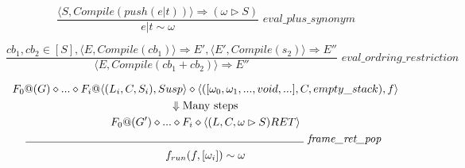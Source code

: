 \documentclass[]{article}
\numberwithin{equation}{section}
\numberwithin{figure}{section}
\numberwithin{table}{section}
\begin{document}
\[\frac{\langle S, Compile(push(e|t)) \rangle \Rightarrow (\omega \rhd S)}
        {e|t \sim \omega} \textit{ eval\_plus\_synonym} \]

\[\frac{cb_1, cb_2 \in [S], \langle E, Compile(cb_1) \rangle \Rightarrow E', \langle E', Compile(s_2) \rangle \Rightarrow E''}
       {\langle E, Compile(cb_1 + cb_2) \rangle \Rightarrow E''} \textit{ eval\_ordring\_restriction } \]

\begin{gather*} F_0@(G) \diamond ... \diamond F_i @\langle(L_i, C, S_i) , Susp \rangle \diamond \langle ([\omega_0, \omega_1, ..., void, ...], C, empty\_stack) , f \rangle \\ \Downarrow \text{Many steps} \\ F_0@(G') \diamond ... \diamond F_i \diamond \langle (L, C, \omega \rhd S) RET \rangle \\ \line(1,0){250} \textit{ frame\_ret\_pop } \\f_{run}(f, [\omega_i]) \sim \omega
\end{gather*}
\end{document}
